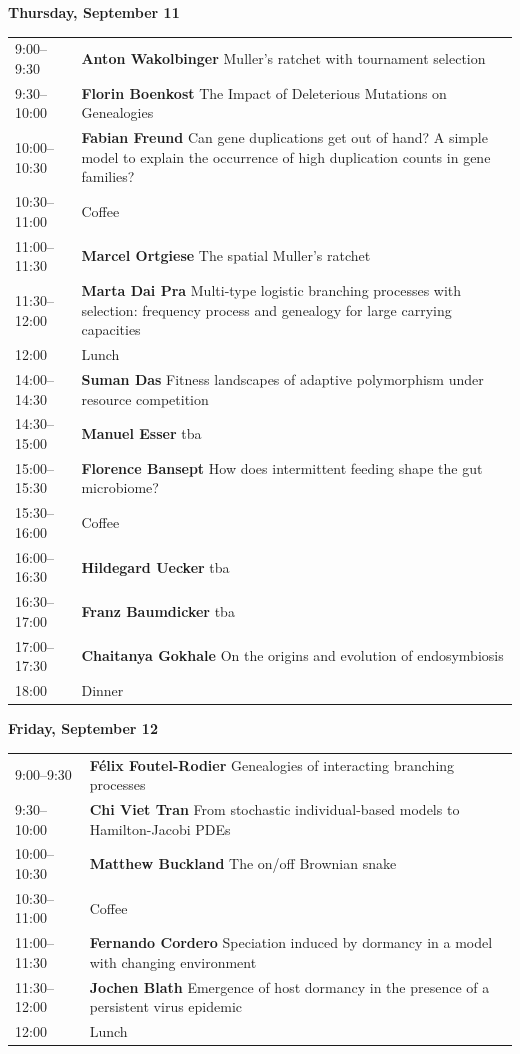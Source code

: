 \documentclass[12pt,a4paper]{article}
\begin{document}
\textbf{\Large Thursday, September 11}\medskip

\begin{tabular}{@{}l p{}@{}}
9:00--9:30 &\textbf{Anton Wakolbinger } Muller's ratchet with tournament selection \\
9:30--10:00 &\textbf{Florin Boenkost } The Impact of Deleterious Mutations on Genealogies \\
10:00--10:30 &\textbf{Fabian Freund } Can gene duplications get out of hand? A simple model to explain the occurrence of high duplication counts in gene families? \\
10:30--11:00 & Coffee \\
11:00--11:30 &\textbf{Marcel Ortgiese } The spatial Muller's ratchet \\
11:30--12:00 &\textbf{Marta Dai Pra } Multi-type logistic branching processes with selection: frequency process and genealogy for large carrying capacities \\
12:00 & Lunch \\
14:00--14:30 &\textbf{Suman Das } Fitness landscapes of adaptive polymorphism under resource competition \\
14:30--15:00 &\textbf{Manuel Esser } tba \\
15:00--15:30 &\textbf{Florence Bansept } How does intermittent feeding shape the gut microbiome? \\
15:30--16:00 & Coffee \\
16:00--16:30 &\textbf{Hildegard Uecker } tba \\
16:30--17:00 &\textbf{Franz Baumdicker } tba \\
17:00--17:30 &\textbf{Chaitanya Gokhale } On the origins and evolution of endosymbiosis \\
18:00 & Dinner \\
\end{tabular}

\textbf{\Large Friday, September 12}\medskip

\begin{tabular}{@{}l p{}@{}}
9:00--9:30 &\textbf{Félix Foutel-Rodier } Genealogies of interacting branching processes \\
9:30--10:00 &\textbf{Chi Viet Tran } From stochastic individual-based models to Hamilton-Jacobi PDEs \\
10:00--10:30 &\textbf{Matthew Buckland } The on/off Brownian snake \\
10:30--11:00 & Coffee \\
11:00--11:30 &\textbf{Fernando Cordero } Speciation induced by dormancy in a model with changing environment \\
11:30--12:00 &\textbf{Jochen Blath } Emergence of host dormancy in the presence of a persistent virus epidemic \\
12:00 & Lunch \\
\end{tabular}
\end{document}

